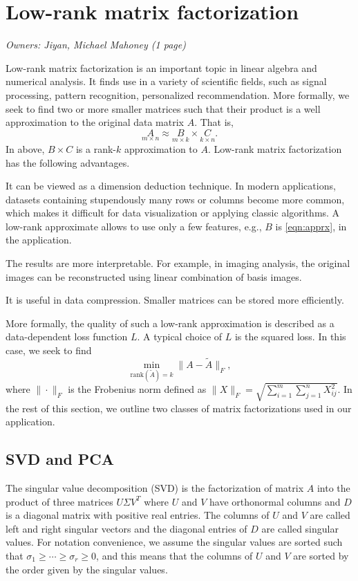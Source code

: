 \section{Low-rank matrix factorization}
\textit{Owners: Jiyan, Michael Mahoney (1 page)}

Low-rank matrix factorization is an important topic in linear algebra and numerical analysis.
It finds use in a variety of scientific fields, such as signal processing, pattern recognition, personalized recommendation.
More formally, we seek to find two or more smaller matrices such that their product is a well approximation to the original data matrix $A$.
That is,
\begin{equation}
 \label{eqn:apprx}
    \underset{m\times n}{A} \approx \underset{m\times k}{B} \times \underset{k\times n}{C}.
\end{equation}
In above, $B \times C$ is a rank-$k$ approximation to $A$.
Low-rank matrix factorization has the following advantages.
\begin{compactitem}
\item
It can be viewed as a dimension deduction technique.
In modern applications, datasets containing stupendously many rows or columns become more common, which makes it difficult for data visualization or applying classic algorithms. A low-rank approximate allows to use only a few features, e.g., $B$ is \eqref{eqn:apprx}, in the application.
\item
The results are more interpretable.
For example, in imaging analysis, the original images can be reconstructed using linear combination of basis images.
\item
It is useful in data compression.
Smaller matrices can be stored more efficiently.
\end{compactitem}

More formally, the quality of such a low-rank approximation is described as a data-dependent loss function $L$. A typical choice of $L$ is the squared loss. In this case, we seek to find
\begin{equation}
 \label{eqn:obj}
  \min_{\text{rank}(\tilde A) = k} \| A - \tilde A \|_F,
\end{equation}
where $\| \cdot \|_F$ is the Frobenius norm defined as $\|X\|_F = \sqrt{ \sum_{i=1}^m \sum_{j=1}^n X_{ij}^2 }$.
In the rest of this section, we outline two classes of matrix factorizations used in our application.

\subsection{SVD and PCA}
The singular value decomposition (SVD) is the factorization of matrix $A$ into the product of three matrices $U\Sigma V^T$ where $U$ and $V$ have orthonormal columns and $D$ is a diagonal matrix with positive real entries. The columns of $U$ and $V$ are called left and right singular vectors and the diagonal entries of $D$ are called singular values. For notation convenience, we assume the singular values are sorted such that $\sigma_1\geq \cdots \geq \sigma_r\geq 0$, and
this means that the columns of $U$ and $V$ are sorted by the order given by the singular values.  

